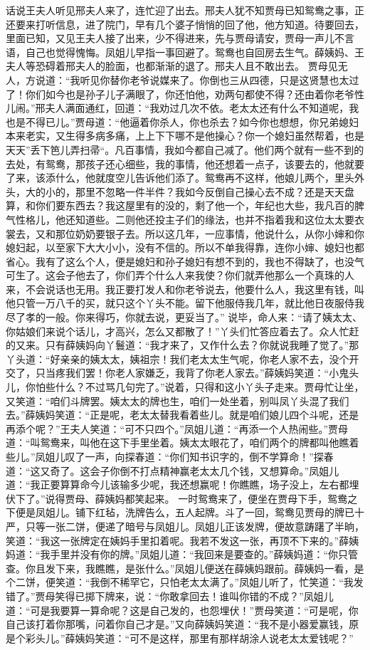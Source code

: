 \documentclass[12pt,oneside]{book}
\begin{document}
话说王夫人听见邢夫人来了，连忙迎了出去。邢夫人犹不知贾母已知鸳鸯之事，正还要来打听信息，进了院门，早有几个婆子悄悄的回了他，他方知道。待要回去，里面已知，又见王夫人接了出来，少不得进来，先与贾母请安，贾母一声儿不言语，自己也觉得愧悔。凤姐儿早指一事回避了。鸳鸯也自回房去生气。薛姨妈、王夫人等恐碍着邢夫人的脸面，也都渐渐的退了。邢夫人且不敢出去。
贾母见无人，方说道：“我听见你替你老爷说媒来了。你倒也三从四德，只是这贤慧也太过了！你们如今也是孙子儿子满眼了，你还怕他，劝两句都使不得？还由着你老爷性儿闹。”邢夫人满面通红，回道：“我劝过几次不依。老太太还有什么不知道呢，我也是不得已儿。”贾母道：“他逼着你杀人，你也杀去？如今你也想想，你兄弟媳妇本来老实，又生得多病多痛，上上下下哪不是他操心？你一个媳妇虽然帮着，也是天天”丢下笆儿弄扫帚“。凡百事情，我如今都自己减了。他们两个就有一些不到的去处，有鸳鸯，那孩子还心细些，我的事情，他还想着一点子，该要去的，他就要了来，该添什么，他就度空儿告诉他们添了。鸳鸯再不这样，他娘儿两个，里头外头，大的小的，那里不忽略一件半件？我如今反倒自己操心去不成？还是天天盘算，和你们要东西去？我这屋里有的没的，剩了他一个，年纪也大些，我凡百的脾气性格儿，他还知道些。二则他还投主子们的缘法，也并不指着我和这位太太要衣裳去，又和那位奶奶要银子去。所以这几年，一应事情，他说什么，从你小婶和你媳妇起，以至家下大大小小，没有不信的。所以不单我得靠，连你小婶、媳妇也都省心。我有了这么个人，便是媳妇和孙子媳妇有想不到的，我也不得缺了，也没气可生了。这会子他去了，你们弄个什么人来我使？你们就弄他那么一个真珠的人来，不会说话也无用。我正要打发人和你老爷说去，他要什么人，我这里有钱，叫他只管一万八千的买，就只这个丫头不能。留下他服侍我几年，就比他日夜服侍我尽了孝的一般。你来得巧，你就去说，更妥当了。”
说毕，命人来：“请了姨太太、你姑娘们来说个话儿，才高兴，怎么又都散了！”丫头们忙答应着去了。众人忙赶的又来。只有薛姨妈向丫鬟道：“我才来了，又作什么去？你就说我睡了觉了。”那丫头道：“好亲亲的姨太太，姨祖宗！我们老太太生气呢，你老人家不去，没个开交了，只当疼我们罢！你老人家嫌乏，我背了你老人家去。”薛姨妈笑道：“小鬼头儿，你怕些什么？不过骂几句完了。”说着，只得和这小丫头子走来。贾母忙让坐，又笑道：“咱们斗牌罢。姨太太的牌也生，咱们一处坐着，别叫凤丫头混了我们去。”薛姨妈笑道：“正是呢，老太太替我看着些儿。就是咱们娘儿四个斗呢，还是再添个呢？”王夫人笑道：“可不只四个。”凤姐儿道：“再添一个人热闹些。”贾母道：“叫鸳鸯来，叫他在这下手里坐着。姨太太眼花了，咱们两个的牌都叫他瞧着些儿。”凤姐儿叹了一声，向探春道：“你们知书识字的，倒不学算命！”探春道：“这又奇了。这会子你倒不打点精神赢老太太几个钱，又想算命。”凤姐儿道：“我正要算算命今儿该输多少呢，我还想赢呢！你瞧瞧，场子没上，左右都埋伏下了。”说得贾母、薛姨妈都笑起来。
一时鸳鸯来了，便坐在贾母下手，鸳鸯之下便是凤姐儿。铺下红毡，洗牌告么，五人起牌。斗了一回，鸳鸯见贾母的牌已十严，只等一张二饼，便递了暗号与凤姐儿。凤姐儿正该发牌，便故意踌躇了半晌，笑道：“我这一张牌定在姨妈手里扣着呢。我若不发这一张，再顶不下来的。”薛姨妈道：“我手里并没有你的牌。”凤姐儿道：“我回来是要查的。”薛姨妈道：“你只管查。你且发下来，我瞧瞧，是张什么。”凤姐儿便送在薛姨妈跟前。薛姨妈一看，是个二饼，便笑道：“我倒不稀罕它，只怕老太太满了。”凤姐儿听了，忙笑道：“我发错了。”贾母笑得已掷下牌来，说：“你敢拿回去！谁叫你错的不成？”凤姐儿道：“可是我要算一算命呢？这是自己发的，也怨埋伏！”贾母笑道：“可是呢，你自己该打着你那嘴，问着你自己才是。”又向薛姨妈笑道：“我不是小器爱赢钱，原是个彩头儿。”薛姨妈笑道：“可不是这样，那里有那样胡涂人说老太太爱钱呢？”
\end{document}
